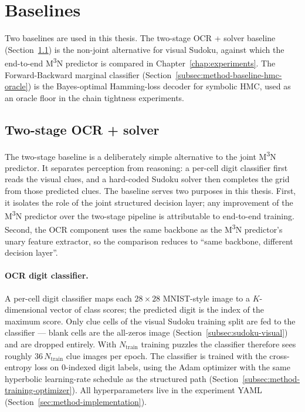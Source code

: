 \section{Baselines}
\label{sec:method-baseline}

Two baselines are used in this thesis. The two-stage OCR +
solver baseline
(Section~\ref{subsec:method-baseline-two-stage}) is the
non-joint alternative for visual Sudoku, against which the
end-to-end M\textsuperscript{3}N predictor is compared in
Chapter~\ref{chap:experiments}. The Forward-Backward marginal
classifier (Section~\ref{subsec:method-baseline-hmc-oracle}) is
the Bayes-optimal Hamming-loss decoder for symbolic HMC, used
as an oracle floor in the chain tightness experiments.

\subsection{Two-stage OCR + solver}
\label{subsec:method-baseline-two-stage}

The two-stage baseline is a deliberately simple alternative to
the joint M\textsuperscript{3}N predictor. It separates
perception from reasoning: a per-cell digit classifier first
reads the visual clues, and a hard-coded Sudoku solver then
completes the grid from those predicted clues. The baseline
serves two purposes in this thesis. First, it isolates the role
of the joint structured decision layer; any improvement of the
M\textsuperscript{3}N predictor over the two-stage pipeline is
attributable to end-to-end training. Second, the OCR component
uses the same backbone as the M\textsuperscript{3}N predictor's
unary feature extractor, so the comparison reduces to ``same
backbone, different decision layer''.

\paragraph{OCR digit classifier.}
A per-cell digit classifier maps each $28 \times 28$
MNIST-style image to a $K$-dimensional vector of class scores;
the predicted digit is the index of the maximum score. Only
clue cells of the visual Sudoku training split are fed to the
classifier --- blank cells are the all-zeros image
(Section~\ref{subsec:sudoku-visual}) and are dropped entirely.
With $N_{\mathrm{train}}$ training puzzles the classifier
therefore sees roughly $36\, N_{\mathrm{train}}$ clue images
per epoch. The classifier is trained with the cross-entropy
loss on 0-indexed digit labels, using the Adam optimizer with
the same hyperbolic learning-rate schedule as the structured
path (Section~\ref{subsec:method-training-optimizer}). All
hyperparameters live in the experiment YAML
(Section~\ref{sec:method-implementation}).

